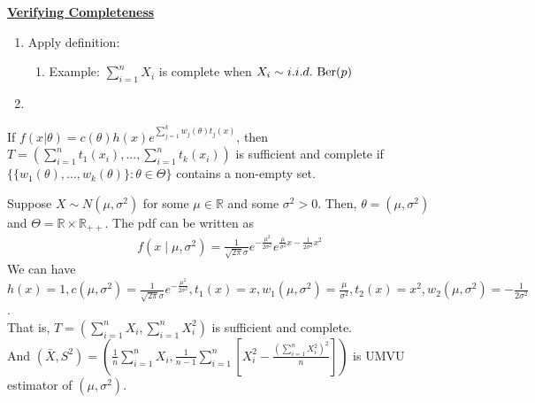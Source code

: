 \documentclass[11pt]{elegantbook}
\begin{document}
\textbf{\underline{Verifying Completeness}}
\begin{enumerate}[$\bullet$]
    \item Apply definition:
    \begin{enumerate}[$\circ$]
        \item Example: $\sum_{i=1}^n X_i$ is complete when $X_i\sim i.i.d. \textnormal{ Ber}(p)$
    \end{enumerate}
    \item 
\end{enumerate}

\begin{proposition}
    If $f(x|\theta)=c(\theta)h(x)e^{\sum_{j=1}^k w_j(\theta) t_j(x)}$, then $T=(\sum_{i=1}^n t_1(x_i),...,\sum_{i=1}^n t_k(x_i))$ is sufficient and complete if $\{\{w_1(\theta),...,w_k(\theta)\}:\theta\in\Theta\}$ contains a non-empty set.
\end{proposition}
\begin{example}
    Suppose $X\sim N(\mu,\sigma^2)$ for some $\mu\in \mathbb{R}$ and some $\sigma^2>0$. Then, $\theta=(\mu,\sigma^2)$ and $\Theta=\mathbb{R}\times \mathbb{R}_{++}$. The pdf can be written as
    \begin{equation}
        \begin{aligned}
            f(x\mid \mu,\sigma^2)=\frac{1}{\sqrt{2\pi}\sigma}e^{-\frac{\mu^2}{2\sigma^2}}e^{\frac{\mu}{\sigma^2}x-\frac{1}{2\sigma^2}x^2}
        \end{aligned}
        \nonumber
    \end{equation}
    We can have $h(x)=1, c(\mu,\sigma^2)=\frac{1}{\sqrt{2\pi}\sigma}e^{-\frac{\mu^2}{2\sigma^2}}, t_1(x)=x, w_1(\mu,\sigma^2)=\frac{\mu}{\sigma^2}, t_2(x)=x^2, w_2(\mu,\sigma^2)=-\frac{1}{2\sigma^2}$.\\
    That is, $T=\left(\sum_{i=1}^n X_i, \sum_{i=1}^n X_i^2\right)$ is sufficient and complete.\\
    And $\left(\bar{X},S^2\right)=\left(\frac{1}{n}\sum_{i=1}^n X_i,\frac{1}{n-1}\sum_{i=1}^n\left[X_i^2-\frac{(\sum_{i=1}^n X_i^2)^2}{n}\right]\right)$ is UMVU estimator of $(\mu,\sigma^2)$.
\end{example}
\end{document}
